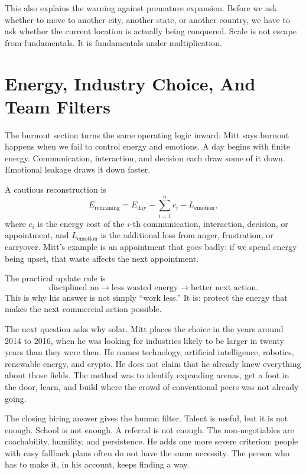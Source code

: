 This also explains the warning against premature expansion. Before we ask whether to move to another city, another state, or another country, we have to ask whether the current location is actually being conquered. Scale is not escape from fundamentals. It is fundamentals under multiplication.

\section{Energy, Industry Choice, And Team Filters}

The burnout section turns the same operating logic inward. Mitt says burnout happens when we fail to control energy and emotions. A day begins with finite energy. Communication, interaction, and decision each draw some of it down. Emotional leakage draws it down faster.

A cautious reconstruction is
\begin{equation}
E_{\text{remaining}}
=
E_{\text{day}}
-\sum_{i=1}^{n} c_i
-L_{\text{emotion}},
\end{equation}
where \(c_i\) is the energy cost of the \(i\)-th communication, interaction, decision, or appointment, and \(L_{\text{emotion}}\) is the additional loss from anger, frustration, or carryover. Mitt's example is an appointment that goes badly: if we spend energy being upset, that waste affects the next appointment.

The practical update rule is
\begin{equation}
\text{disciplined no}
\longrightarrow
\text{less wasted energy}
\longrightarrow
\text{better next action}.
\end{equation}
This is why his answer is not simply ``work less.'' It is: protect the energy that makes the next commercial action possible.

The next question asks why solar. Mitt places the choice in the years around 2014 to 2016, when he was looking for industries likely to be larger in twenty years than they were then. He names technology, artificial intelligence, robotics, renewable energy, and crypto. He does not claim that he already knew everything about those fields. The method was to identify expanding arenas, get a foot in the door, learn, and build where the crowd of conventional peers was not already going.

The closing hiring answer gives the human filter. Talent is useful, but it is not enough. School is not enough. A referral is not enough. The non-negotiables are coachability, humility, and persistence. He adds one more severe criterion: people with easy fallback plans often do not have the same necessity. The person who has to make it, in his account, keeps finding a way.

